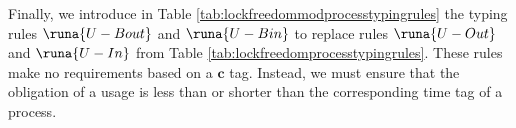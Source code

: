 

Finally, we introduce in Table \ref{tab:lockfreedommodprocesstypingrules} the typing rules $\runa{U-Bout}$ and $\runa{U-Bin}$ to replace rules $\runa{U-Out}$ and $\runa{U-In}$ from Table \ref{tab:lockfreedomprocesstypingrules}. These rules make no requirements based on a $\mathbf{c}$ tag. Instead, we must ensure that the obligation of a usage is less than or shorter than the corresponding time tag of a process.

